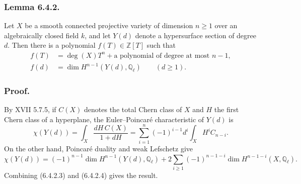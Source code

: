 \subsubsection*{Lemma 6.4.2.}
Let $X$ be a smooth connected projective variety of dimension $n\ge1$
over an algebraically closed field $k$, and let $Y(d)$ denote a
hypersurface section of degree $d$.  Then there is a polynomial
$f(T)\in\mathbb Z[T]$ such that
\begin{align}
f(T)&=\deg(X)T^n+\text{a polynomial of degree at most }n-1,
  \tag{6.4.2.1}\\
f(d)&=\dim H^{n-1}(Y(d),\mathbb Q_\ell)\qquad(d\ge1).
  \tag{6.4.2.2}
\end{align}

\subsubsection*{Proof.}
By XVII 5.7.5, if $C(X)$ denotes the total Chern class of $X$ and $H$
the first Chern class of a hyperplane, the Euler--Poincaré
characteristic of $Y(d)$ is
\begin{equation}\tag{6.4.2.3}
\chi(Y(d))
=\int_X\frac{dH\,C(X)}{1+dH}
=\sum_{i=1}^{n}(-1)^{i-1}d^i\int_X H^iC_{n-i}.
\end{equation}
On the other hand, Poincaré duality and weak Lefschetz give
\begin{equation}\tag{6.4.2.4}
\chi(Y(d))
=(-1)^{n-1}\dim H^{n-1}(Y(d),\mathbb Q_\ell)
+2\sum_{i\ge1}(-1)^{n-1-i}
  \dim H^{n-1-i}(X,\mathbb Q_\ell).
\end{equation}
Combining (6.4.2.3) and (6.4.2.4) gives the result.

